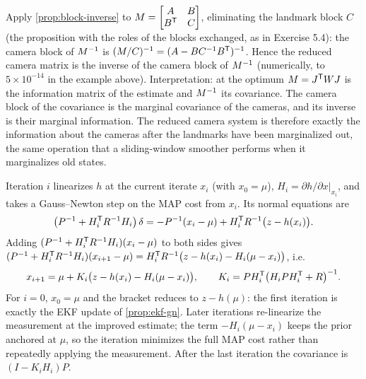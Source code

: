 \begin{solutions}
  \item Apply \cref{prop:block-inverse} to $M = \begin{bmatrix}A & B\\ B^{\mathsf{T}} & C\end{bmatrix}$, eliminating the landmark block $C$ (the proposition with the roles of
        the blocks exchanged, as in Exercise 5.4): the camera block of $M^{-1}$ is $(M/C)^{-1} = (A - BC^{-1} B^{\mathsf{T}})^{-1}$. Hence the reduced camera matrix is the
        inverse of the camera block of $M^{-1}$ (numerically, to $5\times10^{-14}$ in the example above). Interpretation: at the optimum $M = J^{\mathsf{T}} WJ$ is the
        information matrix of the estimate and $M^{-1}$ its covariance. The camera block of the covariance is the marginal covariance of the cameras,
        and its inverse is their marginal information. The reduced camera system is therefore exactly the information about the cameras after the
        landmarks have been marginalized out, the same operation that a sliding-window smoother performs when it marginalizes old states.

  \item Iteration $i$ linearizes $h$ at the current iterate $x_i$ (with $x_0 = \mu$), $H_i = \partial h/\partial x|_{x_i}$, and takes a Gauss--Newton step on the MAP
        cost from $x_i$. Its normal equations are
        \[
          \big(P^{-1} + H_i^{\mathsf{T}} R^{-1} H_i\big)\,\delta = -P^{-1}(x_i - \mu) + H_i^{\mathsf{T}} R^{-1}\big(z - h(x_i)\big).
        \]
        Adding $(P^{-1} + H_i^{\mathsf{T}} R^{-1} H_i)(x_i - \mu)$ to both sides gives $(P^{-1} + H_i^{\mathsf{T}} R^{-1} H_i)(x_{i+1} - \mu) = H_i^{\mathsf{T}} R^{-1}\big(z - h(x_i) - H_i(\mu - x_i)\big)$, i.e.
        \[
          x_{i+1} = \mu + K_i\big(z - h(x_i) - H_i(\mu - x_i)\big), \qquad K_i = PH_i^{\mathsf{T}}\big(H_iPH_i^{\mathsf{T}} + R\big)^{-1} .
        \]
        For $i = 0$, $x_0 = \mu$ and the bracket reduces to $z - h(\mu)$: the first iteration is exactly the EKF update of \cref{prop:ekf-gn}. Later
        iterations re-linearize the measurement at the improved estimate; the term $-H_i(\mu - x_i)$ keeps the prior anchored at $\mu$, so the iteration
        minimizes the full MAP cost rather than repeatedly applying the measurement. After the last iteration the covariance is $(I - K_iH_i)P$.
\end{solutions}
